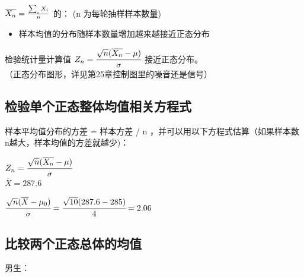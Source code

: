 \(\overline{X_n} = {\sum_i X_i \over n}\) 的： (n 为每轮抽样样本数量)

\begin{description}
\item[]
\end{description}

\begin{itemize}
\tightlist
\item
  样本均值的分布随样本数量增加越来越接近正态分布
\end{itemize}

检验统计量计算值
\(Z_n = \cfrac{ \sqrt{n}(\overline{X_n} - \mu) }{\sigma}\)
接近正态分布。\\

（正态分布图形，详见第25章控制图里的噪音还是信号）

\hypertarget{ux68c0ux9a8cux5355ux4e2aux6b63ux6001ux6574ux4f53ux5747ux503cux76f8ux5173ux65b9ux7a0bux5f0f}{%
\subsection{检验单个正态整体均值相关方程式}\label{ux68c0ux9a8cux5355ux4e2aux6b63ux6001ux6574ux4f53ux5747ux503cux76f8ux5173ux65b9ux7a0bux5f0f}}

样本平均值分布的方差 = 样本方差 / n
，并可以用以下方程式估算（如果样本数n越大，样本均值的方差就越少)：

\(Z_n = \cfrac{ \sqrt{n}(\overline{X_n} - \mu) }{\sigma}\)\\

\(\overline{X} = 287.6\)

\(\cfrac{ \sqrt{n}(\overline{X} - \mu_0) }{\sigma} = \cfrac{ \sqrt{10}( 287.6 - 285 ) }{4} = 2.06\)\\

\hypertarget{ux6bd4ux8f83ux4e24ux4e2aux6b63ux6001ux603bux4f53ux7684ux5747ux503c-1}{%
\subsection{比较两个正态总体的均值}\label{ux6bd4ux8f83ux4e24ux4e2aux6b63ux6001ux603bux4f53ux7684ux5747ux503c-1}}

\begin{description}
\tightlist
\item[]
男生：
\end{description}

